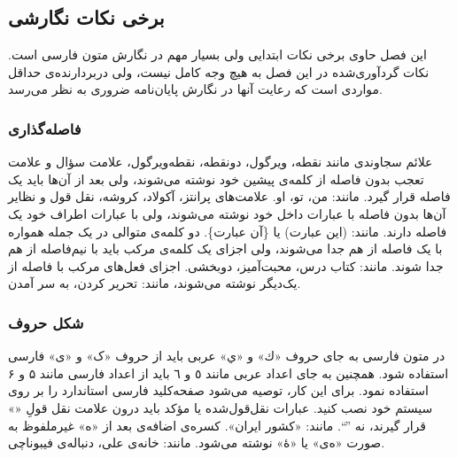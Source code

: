 \subsection{برخی نکات نگارشی}

این فصل حاوی برخی نکات ابتدایی ولی بسیار مهم در نگارش متون فارسی است.
نکات گردآوری‌شده در این فصل به‌ هیچ‌ وجه کامل نیست،
ولی دربردارنده‌ی حداقل مواردی است که رعایت آنها در نگارش پایان‌نامه ضروری به نظر می‌رسد.

\subsubsection{فاصله‌گذاری}


علائم سجاوندی مانند نقطه، ویرگول، دونقطه، نقطه‌ویرگول، علامت سؤال و علامت تعجب %
بدون فاصله از کلمه‌ی پیشین خود نوشته می‌شوند، ولی بعد از آن‌ها باید یک فاصله‌ قرار گیرد. مانند: من، تو، او.
علامت‌های پرانتز، آکولاد، کروشه، نقل قول و نظایر آن‌ها بدون فاصله با عبارات داخل خود نوشته می‌شوند، ولی با عبارات اطراف خود یک فاصله دارند. مانند: (این عبارت) یا \{آن عبارت\}.
دو کلمه‌ی متوالی در یک جمله همواره با یک فاصله از هم جدا می‌شوند، ولی اجزای یک کلمه‌ی مرکب باید با نیم‌فاصله‌‌
از هم جدا شوند. مانند: کتاب درس، محبت‌آمیز، دوبخشی.
اجزای فعل‌های مرکب با فاصله از یک‌دیگر نوشته می‌شوند، مانند: تحریر کردن، به سر آمدن.


\subsubsection{شکل حروف}


در متون فارسی به جای حروف «ك» و «ي» عربی باید از حروف «ک» و «ی» فارسی استفاده شود. همچنین به جای اعداد عربی مانند ٥ و ٦ باید از اعداد فارسی مانند ۵ و ۶ استفاده نمود.
برای این کار، توصیه می‌شود صفحه‌کلید‌ فارسی استاندارد را بر روی سیستم خود نصب کنید.
عبارات نقل‌قول‌شده یا مؤکد باید درون علامت نقل قولِ «» قرار گیرند، نه ''``. مانند: «کشور ایران».
کسره‌ی اضافه‌ی بعد از «ه» غیرملفوظ به صورت «ه‌ی» یا «هٔ» نوشته می‌شود. مانند: خانه‌ی علی، دنباله‌ی فیبوناچی.

